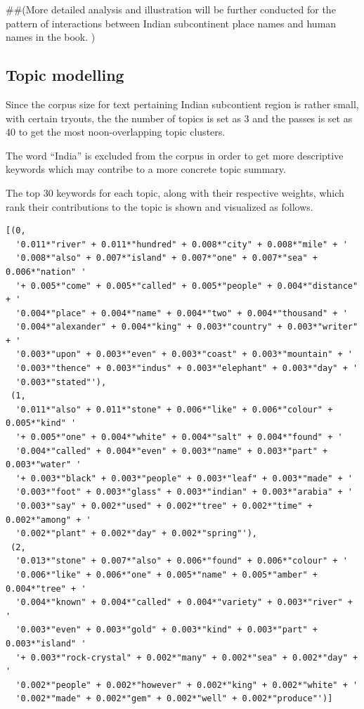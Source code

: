 \documentclass[
  12pt,
]{article}
\begin{document}
\#\#(More detailed analysis and illustration will be further conducted
for the pattern of interactions between Indian subcontinent place names
and human names in the book. )

\hypertarget{topic-modelling}{%
\subsection{Topic modelling}\label{topic-modelling}}

Since the corpus size for text pertaining Indian subcontient region is
rather small, with certain tryouts, the the number of topics is set as 3
and the passes is set as 40 to get the most noon-overlapping topic
clusters.

The word ``India'' is excluded from the corpus in order to get more
descriptive keywords which may contribe to a more concrete topic
summary.

The top 30 keywords for each topic, along with their respective weights,
which rank their contributions to the topic is shown and visualized as
follows.

\begin{verbatim}
[(0,
  '0.011*"river" + 0.011*"hundred" + 0.008*"city" + 0.008*"mile" + '
  '0.008*"also" + 0.007*"island" + 0.007*"one" + 0.007*"sea" + 0.006*"nation" '
  '+ 0.005*"come" + 0.005*"called" + 0.005*"people" + 0.004*"distance" + '
  '0.004*"place" + 0.004*"name" + 0.004*"two" + 0.004*"thousand" + '
  '0.004*"alexander" + 0.004*"king" + 0.003*"country" + 0.003*"writer" + '
  '0.003*"upon" + 0.003*"even" + 0.003*"coast" + 0.003*"mountain" + '
  '0.003*"thence" + 0.003*"indus" + 0.003*"elephant" + 0.003*"day" + '
  '0.003*"stated"'),
 (1,
  '0.011*"also" + 0.011*"stone" + 0.006*"like" + 0.006*"colour" + 0.005*"kind" '
  '+ 0.005*"one" + 0.004*"white" + 0.004*"salt" + 0.004*"found" + '
  '0.004*"called" + 0.004*"even" + 0.003*"name" + 0.003*"part" + 0.003*"water" '
  '+ 0.003*"black" + 0.003*"people" + 0.003*"leaf" + 0.003*"made" + '
  '0.003*"foot" + 0.003*"glass" + 0.003*"indian" + 0.003*"arabia" + '
  '0.003*"say" + 0.002*"used" + 0.002*"tree" + 0.002*"time" + 0.002*"among" + '
  '0.002*"plant" + 0.002*"day" + 0.002*"spring"'),
 (2,
  '0.013*"stone" + 0.007*"also" + 0.006*"found" + 0.006*"colour" + '
  '0.006*"like" + 0.006*"one" + 0.005*"name" + 0.005*"amber" + 0.004*"tree" + '
  '0.004*"known" + 0.004*"called" + 0.004*"variety" + 0.003*"river" + '
  '0.003*"even" + 0.003*"gold" + 0.003*"kind" + 0.003*"part" + 0.003*"island" '
  '+ 0.003*"rock-crystal" + 0.002*"many" + 0.002*"sea" + 0.002*"day" + '
  '0.002*"people" + 0.002*"however" + 0.002*"king" + 0.002*"white" + '
  '0.002*"made" + 0.002*"gem" + 0.002*"well" + 0.002*"produce"')]
\end{verbatim}
\end{document}
